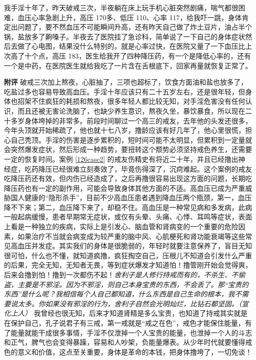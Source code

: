 \begin{case}
    我手淫十年了，昨天破戒三次，半夜躺在床上玩手机心脏突然剧痛，喘气都很困难，血压心率急剧上升，高压 170多、低压 110、心率 117，给我吓一跳，身体肯定出问题了，要不然血压不可能瞬间升高，还有昨天自己做了炸土豆片，油占半个锅，盐放多了齁嗓子。半夜去了医院挂了急诊科，简单说了一下自己的身体症状然后去做了心电图，结果没什么特别的，就是心率过快，在医院又量了一下血压比上次高了十个点，高压 183，医生给我开了四种降压药，有一个是降低心率的，还有一个是中药，在医院医生就给我吃了一片含在舌根底下，回家再量就恢复正常了。

    \textbf{附评} 破戒三次加上熬夜，心脏抽了，三项也超标了，饮食方面油和盐也放多了，吃盐过多也容易导致高血压。手淫十年应该只有二十五岁左右，还是很年轻，但身体也招架不住疯狂的耗损和熬夜，很多年轻人都比较无知，对手淫危害没有任何认识，而且还被无害论洗脑了，也缺少养生意识，熬夜久坐，暴饮暴食，所以现在二十多岁身体垮掉的非常多。前段时间聊过一个高三的戒友，去年他的头发还很多，今年头顶就开始稀疏了，他也就十七八岁，撸龄应该有好几年了，他心里很慌，担心自己秃顶。手淫的伤害是逐步累积的，短时间可能不太明显，但累积到一定量就会突然爆发症状，然后形成一种趋势，要扭转这个颓势必须坚持戒色养生，还需要一定的恢复时间。案例 \ref{126case2} 的戒友伤精史有将近二十年，并且已经撸出神经症，吃药降压已经很难立刻奏效了，毕竟伤得深了，沉疴难起。这个案例的戒友吃降压药还有效，但内伤已经造成了，之后再撸很容易出现这方面的问题，长期吃降压药也有一定的副作用，可能会导致身体其他方面的不适。高血压已成为严重威胁国人健康的“隐形杀手”，目前不少高血压患者遇到降血压两个瓶颈，第一，血压降不下来；第二，血压降下来了，却稳不住。高血压是一种常见病和多发病，此病一般起病缓慢，患者早期常无症状，或仅有头晕、头痛、心悸、耳鸣等症状，表面上看是一种独立的疾病，实际上是引发心、脑血管和肾病变的一个重要的危险因素，如果治疗不当就会病变成为较严重的脑中风、心肌梗死和肾功能衰竭等这些常见高血压并发症。其实我们的身体是很脆弱的，年轻时就要注意保养了，盲目无知很可怕，什么也不懂，就知道疯撸，疯狂掏空自己，压根儿不知道会引发什么严重的后果，完全无知，无知者无畏，等到症状爆发才知道怕！撸管刚开始会觉得爽，后来会撸到怕！撸到一次都伤不起！\textit{舍利子是人修行持戒而有的，不杀生、不偷盗，主要是不邪淫。因为不邪淫，则自己本身宝贵的东西，不会丢了。那“宝贵的东西”是什么呢？我相信每个人自己都知道，什么东西是自己生命的根本，我不需要说太多。你如果没有邪淫的行为，舍利子自然会光明灿烂，比钻石都坚固。（宣化上人）} 我曾经也很无知，后来才知道肾精是多么宝贵，也知道了持戒其实就是在保护自己，孔子说君子有三戒，第一戒就是“戒之在色”，戒色才能保住能量，有了能量就能干成很多事情，手淫不仅泄掉一个人宝贵的能量，也泄掉一个人的斗志和正气，脾气也会变得暴躁，容易和人吵架，负能量爆表。从少年时代就要懂得戒色的意义和价值，这点至关重要，身体是革命的本钱，把身体撸垮了，一切免谈！
\end{case}

